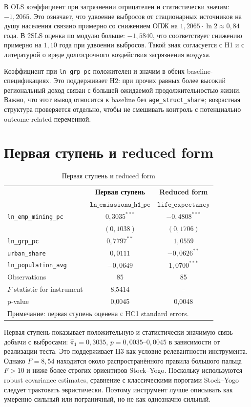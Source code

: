 \documentclass[11pt,a4paper]{article}
\begin{document}
В OLS коэффициент при загрязнении отрицателен и статистически значим: $-1{,}2065$. Это означает, что удвоение выбросов от стационарных источников на душу населения связано примерно со снижением ОПЖ на $1{,}2065\cdot\ln 2\approx0{,}84$ года. В 2SLS оценка по модулю больше: $-1{,}5840$, что соответствует снижению примерно на $1{,}10$ года при удвоении выбросов. Такой знак согласуется с H1 и с литературой о вреде долгосрочного воздействия загрязнения воздуха.

Коэффициент при \texttt{ln\_grp\_pc} положителен и значим в обеих baseline-спецификациях. Это поддерживает H2: при прочих равных более высокий региональный доход связан с большей ожидаемой продолжительностью жизни. Важно, что этот вывод относится к baseline без \texttt{age\_struct\_share}; возрастная структура проверяется отдельно, чтобы не смешивать контроль с потенциально outcome-related переменной.

\section{Первая ступень и reduced form}

\begin{table}[H]
\centering
\caption{Первая ступень и reduced form}
\label{tab:first_rf}
\begin{tabular}{lcc}
\toprule
 & \textbf{Первая ступень} & \textbf{Reduced form} \\
 & $\texttt{ln\_emissions\_h1\_pc}$ & $\texttt{life\_expectancy}$ \\
\midrule
\texttt{ln\_emp\_mining\_pc} & $0{,}3035^{***}$ & $-0{,}4808^{***}$ \\
 & $(0{,}1038)$ & $(0{,}1706)$ \\
\texttt{ln\_grp\_pc} & $0{,}7797^{**}$ & $1{,}0559$ \\
\texttt{urban\_share} & $0{,}0111$ & $-0{,}0626^{**}$ \\
\texttt{ln\_population\_avg} & $-0{,}0649$ & $1{,}0700^{***}$ \\
\midrule
Observations & 85 & 85 \\
$F$-statistic for instrument & 8{,}5414 & -- \\
p-value & 0{,}0045 & 0{,}0048 \\
\bottomrule
\multicolumn{3}{l}{\footnotesize Примечание: первая ступень оценена с HC1 standard errors.}
\end{tabular}
\end{table}

Первая ступень показывает положительную и статистически значимую связь добычи с выбросами: $\hat\pi_1=0{,}3035$, $p=0{,}0035$--$0{,}0045$ в зависимости от реализации теста. Это поддерживает H3 как условие релевантности инструмента. Однако $F=8{,}54$ находится около распространённого правила большого пальца $F>10$ и ниже более строгих ориентиров Stock--Yogo. Поскольку используются robust covariance estimates, сравнение с классическими порогами Stock--Yogo следует трактовать эвристически. Поэтому инструмент лучше описывать как умеренно сильный или пограничный, но не как однозначно сильный.
\end{document}
